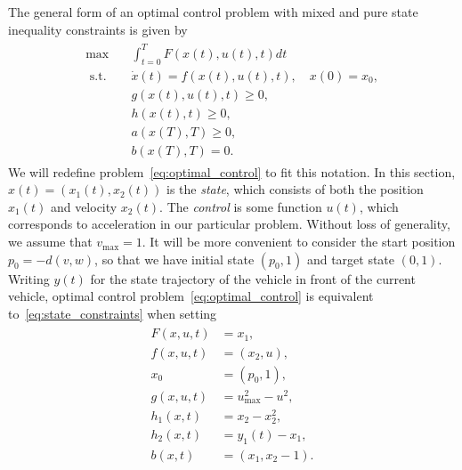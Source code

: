 \documentclass[a4paper]{article}
\theoremstyle{definition}
\theoremstyle{plain}
\begin{document}
The general form of an optimal control problem with mixed and pure state
inequality constraints is given by
\begin{align}
  \begin{split}
  \label{eq:state_constraints}
  \max \quad & \int_{t=0}^{T} F(x(t), u(t), t) dt \\
  \text{ s.t. } \;\, & \dot{x}(t) = f(x(t), u(t), t) , \quad x(0) = x_{0} , \\
                & g(x(t), u(t), t) \geq 0 , \\
             & h(x(t), t) \geq 0 , \\
             & a(x(T), T) \geq 0 , \\
             & b(x(T), T) = 0 .
  \end{split}
\end{align}
%
We will redefine problem~\eqref{eq:optimal_control} to fit this notation. In
this section, $x(t) = (x_{1}(t), x_{2}(t))$ is the \textit{state}, which
consists of both the position $x_{1}(t)$ and velocity $x_{2}(t)$. The
\textit{control} is some function $u(t)$, which corresponds to acceleration in
our particular problem. Without loss of generality, we assume that
$v_{\max} = 1$. It will be more convenient to consider the start position
$p_{0} = - d(v, w)$, so that we have initial state $(p_{0}, 1)$ and target state
$(0, 1)$.
%
Writing $y(t)$ for the state trajectory of the vehicle in front of the current
vehicle, optimal control problem~\eqref{eq:optimal_control} is equivalent
to~\eqref{eq:state_constraints} when setting
\begin{align}
  \label{eq:settings}
\begin{split}
  F(x, u, t) &= x_{1} , \\
  f(x, u, t) &= (x_{2}, u) , \\
  x_{0} &= (p_{0}, 1) , \\
  g(x, u, t) &= u_{\max}^{2} - u^{2} , \\
  h_{1}(x, t) &= x_{2} - x_{2}^{2} , \\
  h_{2}(x, t) &= y_{1}(t) - x_{1} , \\
  b(x, t) &= (x_{1}, x_{2} - 1) .
\end{split}
\end{align}
%
\end{document}
